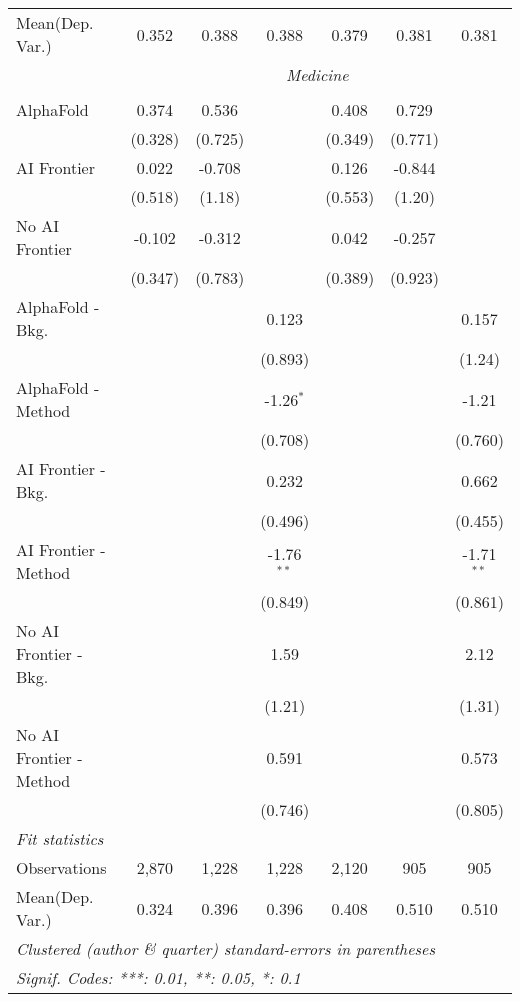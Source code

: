 \begin{tabular}{lcccccc}
Mean(Dep. Var.) & 0.352 & 0.388 & 0.388 & 0.379 & 0.381 & 0.381 \\
 & \multicolumn{6}{c}{\textit{Medicine}} \\ \\
   AlphaFold               & 0.374   & 0.536   &              & 0.408   & 0.729   &   \\   
                           & (0.328) & (0.725) &              & (0.349) & (0.771) &   \\   
   AI Frontier             & 0.022   & -0.708  &              & 0.126   & -0.844  &   \\   
                           & (0.518) & (1.18)  &              & (0.553) & (1.20)  &   \\   
   No AI Frontier          & -0.102  & -0.312  &              & 0.042   & -0.257  &   \\   
                           & (0.347) & (0.783) &              & (0.389) & (0.923) &   \\   
   AlphaFold - Bkg.        &         &         & 0.123        &         &         & 0.157\\   
                           &         &         & (0.893)      &         &         & (1.24)\\   
   AlphaFold - Method      &         &         & -1.26$^{*}$  &         &         & -1.21\\   
                           &         &         & (0.708)      &         &         & (0.760)\\   
   AI Frontier - Bkg.      &         &         & 0.232        &         &         & 0.662\\   
                           &         &         & (0.496)      &         &         & (0.455)\\   
   AI Frontier - Method    &         &         & -1.76$^{**}$ &         &         & -1.71$^{**}$\\   
                           &         &         & (0.849)      &         &         & (0.861)\\   
   No AI Frontier - Bkg.   &         &         & 1.59         &         &         & 2.12\\   
                           &         &         & (1.21)       &         &         & (1.31)\\   
   No AI Frontier - Method &         &         & 0.591        &         &         & 0.573\\   
                           &         &         & (0.746)      &         &         & (0.805)\\   
   \midrule
   \emph{Fit statistics}\\
   Observations            & 2,870   & 1,228   & 1,228        & 2,120   & 905     & 905\\  
Mean(Dep. Var.) & 0.324 & 0.396 & 0.396 & 0.408 & 0.510 & 0.510 \\
   \midrule \midrule
   \multicolumn{7}{l}{\emph{Clustered (author \& quarter) standard-errors in parentheses}}\\
   \multicolumn{7}{l}{\emph{Signif. Codes: ***: 0.01, **: 0.05, *: 0.1}}\\
\end{tabular}
\par\endgroup
